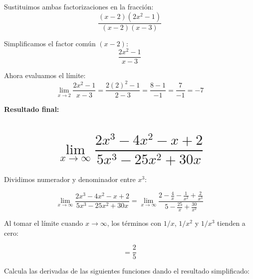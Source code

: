 \documentclass[addpoints,spanish, 12pt,a4paper]{exam}
\begin{document}
\begin{questions}
\begin{multicols}{2}
\begin{parts}
\begin{solution}
    Sustituimos ambas factorizaciones en la fracción:
    \[
    \frac{(x - 2)(2x^2 - 1)}{(x - 2)(x - 3)}
    \]

    Simplificamos el factor común \( (x - 2) \):
    \[
    \frac{2x^2 - 1}{x - 3}
    \]

    Ahora evaluamos el límite:
    \[
    \lim_{x \to 2} \frac{2x^2 - 1}{x - 3} = \frac{2(2)^2 - 1}{2 - 3} = \frac{8 - 1}{-1} = \frac{7}{-1} = -7
    \]

    \textbf{Resultado final:} 
    \end{solution}

    \part[1] {$$\lim_{x \to \infty} \dfrac{2x^3 - 4x^2 - x + 2}{5x^3 - 25x^2 + 30x}$$}

    \begin{solution}
    Dividimos numerador y denominador entre $x^3$:
    
    \[
    \lim_{x \to \infty} \frac{2x^3 - 4x^2 - x + 2}{5x^3 - 25x^2 + 30x}
    = \lim_{x \to \infty} \frac{2 - \frac{4}{x} - \frac{1}{x^2} + \frac{2}{x^3}}{5 - \frac{25}{x} + \frac{30}{x^2}}
    \]
    
    Al tomar el límite cuando $x \to \infty$, los términos con $1/x$, $1/x^2$ y $1/x^3$ tienden a cero:
    
    \[
    = \frac{2}{5}
    \]
    \end{solution}
\end{parts}
    
\end{multicols}

\question[2] Calcula las derivadas de las siguientes funciones dando el resultado simplificado:
\begin{multicols}{2}
\end{multicols}
\end{questions}
\end{document}
